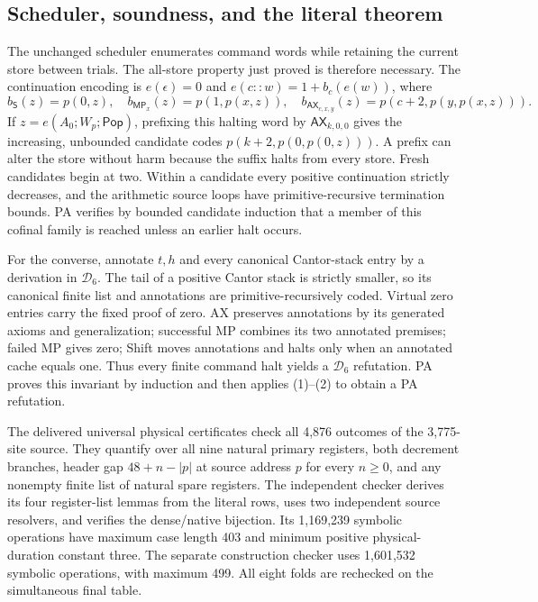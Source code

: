 \subsection{Scheduler, soundness, and the literal theorem}

The unchanged scheduler enumerates command words while retaining the
current store between trials. The all-store property just proved is
therefore necessary. The continuation encoding is $e(\epsilon)=0$ and
$e(c::w)=1+b_c(e(w))$, where
\[
 b_{\mathsf S}(z)=p(0,z),\quad
 b_{\mathsf{MP}_x}(z)=p(1,p(x,z)),\quad
 b_{\mathsf{AX}_{c,x,y}}(z)=p(c+2,p(y,p(x,z))).
\]
If $z=e(A_0;W_p;\mathsf{Pop})$, prefixing this halting word by
$\mathsf{AX}_{k,0,0}$ gives the increasing, unbounded candidate codes
$p(k+2,p(0,p(0,z)))$. A prefix can alter the store without harm because
the suffix halts from every store. Fresh candidates begin at two.
Within a candidate every positive continuation strictly decreases,
and the arithmetic source loops have primitive-recursive termination
bounds. PA verifies by bounded candidate induction that a member of
this cofinal family is reached unless an earlier halt occurs.

For the converse, annotate $t,h$ and every canonical Cantor-stack entry
by a derivation in $\mathcal D_6$. The tail of a positive Cantor stack
is strictly smaller, so its canonical finite list and annotations are
primitive-recursively coded. Virtual zero entries carry the fixed proof
of zero. AX preserves annotations by its generated axioms and
generalization; successful MP combines its two annotated premises;
failed MP gives zero; Shift moves annotations and halts only when an
annotated cache equals one. Thus every finite command halt yields a
$\mathcal D_6$ refutation. PA proves this invariant by induction and
then applies (1)--(2) to obtain a PA refutation.

The delivered universal physical certificates check all 4,876 outcomes
of the 3,775-site source. They quantify over all nine natural primary
registers, both decrement branches, header gap $48+n-|p|$ at source
address $p$ for every $n\geq0$,
and any nonempty finite list of natural spare registers. The independent
checker derives its four register-list lemmas from the literal rows,
uses two independent source resolvers, and verifies the dense/native
bijection. Its 1,169,239 symbolic operations have maximum case length
403 and minimum positive physical-duration constant three. The separate
construction checker uses 1,601,532 symbolic operations, with maximum
499. All eight folds are rechecked on the simultaneous final table.

